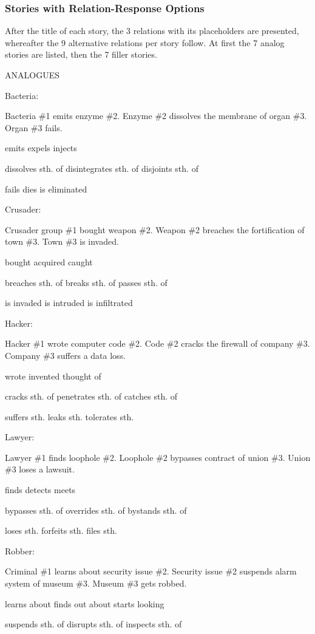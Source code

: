 \subsubsection{Stories with Relation-Response Options}
After the title of each story, the 3 relations with its placeholders are presented, whereafter the 9 alternative relations per story follow. At first the 7 analog stories are listed, then the 7 filler stories.

ANALOGUES

Bacteria:

Bacteria \#1 emits enzyme \#2.
Enzyme \#2 dissolves the membrane of organ \#3.
Organ \#3 fails.

emits
expels
injects

dissolves sth. of
disintegrates sth. of
disjoints sth. of

fails
dies
is eliminated


Crusader:

Crusader group \#1 bought weapon \#2.
Weapon \#2 breaches the fortification of town \#3.
Town \#3 is invaded.

bought
acquired
caught

breaches sth. of
breaks sth. of
passes sth. of

is invaded
is intruded
is infiltrated


Hacker:

Hacker \#1 wrote computer code \#2.
Code \#2 cracks the firewall of company \#3.
Company \#3 suffers a data loss.


wrote
invented
thought of

cracks sth. of
penetrates sth. of
catches sth. of

suffers sth.
leaks sth.
tolerates sth.


Lawyer:

Lawyer \#1 finds loophole \#2.
Loophole \#2 bypasses contract of union \#3.
Union \#3 loses a lawsuit.

finds
detects
meets

bypasses sth. of
overrides sth. of
bystands sth. of

loses sth.
forfeits sth.
files sth.


Robber:

Criminal \#1 learns about security issue \#2.
Security issue \#2 suspends alarm system of museum \#3.
Museum \#3 gets robbed.

learns about
finds out about
starts looking

suspends sth. of
disrupts sth. of
inspects sth. of

